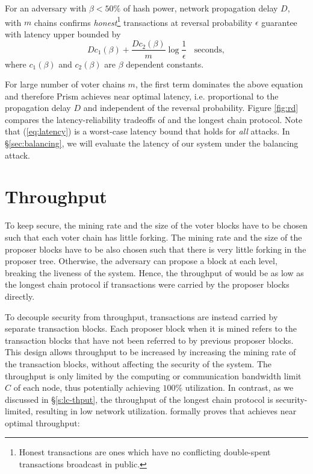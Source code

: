  \begin{theorem} \label{cor:latency_fast}
For an adversary with $\beta< 50\%$ of hash power, network propagation delay $D$, \prism with $m$ chains confirms  \textit{honest}\footnote{Honest transactions are ones which have no conflicting double-spent transactions broadcast in public.} transactions at reversal probability $\epsilon$ guarantee with latency upper bounded by
\begin{equation}
\label{eq:latency}
 Dc_1(\beta) +  \frac{Dc_2(\beta)}{m} \log \frac{1}{\epsilon}\;\; \text{ seconds},
\end{equation}
where $c_1(\beta)$ and $c_2(\beta) $ are $\beta$ dependent constants.
\end{theorem}

For large number of voter chains $m$, the first term dominates the above equation and therefore Prism achieves near optimal latency, i.e. proportional to the propagation delay $D$ and independent of the reversal probability. Figure \ref{fig:rd} compares the latency-reliability tradeoffs of \prism and the longest chain protocol. Note that (\ref{eq:latency}) is a worst-case latency bound that holds for {\em all} attacks. In \S\ref{sec:balancing}, we will evaluate the latency of our system under the balancing attack. 


\section{Throughput}
\label{sec:thruput}

To keep \prism secure, the mining rate and the size of the voter blocks have to be chosen such that each voter chain has little forking. The mining rate and the size of the proposer blocks have to be also chosen such that there is very little forking in the proposer tree. Otherwise, the adversary can propose a block at each level, breaking the liveness of the system. Hence, the throughput of \prism would be as low as the longest chain protocol if transactions were carried by the proposer blocks directly. 


To decouple security from throughput, transactions are instead carried by separate transaction blocks. Each proposer block when it is mined refers to the transaction blocks that have not been referred to by previous proposer blocks. This design allows throughput to be increased by increasing the mining rate of the transaction blocks, without affecting the security of the system. The throughput is only limited by the computing or communication bandwidth limit $C$ of each node, thus potentially achieving $100\%$ utilization. In contrast, as we discussed in \S\ref{s:lc-thput}, the throughput of the longest chain protocol is security-limited, resulting in low network utilization. \cite{prism-theory} formally proves that \prism achieves near optimal throughput:

